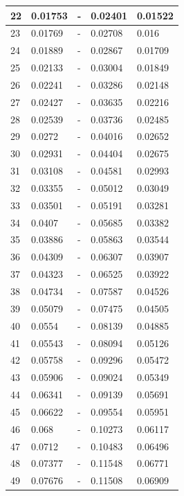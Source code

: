 \begin{table}[!ht]
\begin{tabular}{|l|l|l|l|l|}
        22 & 0.01753 & - & 0.02401 & 0.01522 \\ \hline
        23 & 0.01769 & - & 0.02708 & 0.016 \\ \hline
        24 & 0.01889 & - & 0.02867 & 0.01709 \\ \hline
        25 & 0.02133 & - & 0.03004 & 0.01849 \\ \hline
        26 & 0.02241 & - & 0.03286 & 0.02148 \\ \hline
        27 & 0.02427 & - & 0.03635 & 0.02216 \\ \hline
        28 & 0.02539 & - & 0.03736 & 0.02485 \\ \hline
        29 & 0.0272 & - & 0.04016 & 0.02652 \\ \hline
        30 & 0.02931 & - & 0.04404 & 0.02675 \\ \hline
        31 & 0.03108 & - & 0.04581 & 0.02993 \\ \hline
        32 & 0.03355 & - & 0.05012 & 0.03049 \\ \hline
        33 & 0.03501 & - & 0.05191 & 0.03281 \\ \hline
        34 & 0.0407 & - & 0.05685 & 0.03382 \\ \hline
        35 & 0.03886 & - & 0.05863 & 0.03544 \\ \hline
        36 & 0.04309 & - & 0.06307 & 0.03907 \\ \hline
        37 & 0.04323 & - & 0.06525 & 0.03922 \\ \hline
        38 & 0.04734 & - & 0.07587 & 0.04526 \\ \hline
        39 & 0.05079 & - & 0.07475 & 0.04505 \\ \hline
        40 & 0.0554 & - & 0.08139 & 0.04885 \\ \hline
        41 & 0.05543 & - & 0.08094 & 0.05126 \\ \hline
        42 & 0.05758 & - & 0.09296 & 0.05472 \\ \hline
        43 & 0.05906 & - & 0.09024 & 0.05349 \\ \hline
        44 & 0.06341 & - & 0.09139 & 0.05691 \\ \hline
        45 & 0.06622 & - & 0.09554 & 0.05951 \\ \hline
        46 & 0.068 & - & 0.10273 & 0.06117 \\ \hline
        47 & 0.0712 & - & 0.10483 & 0.06496 \\ \hline
        48 & 0.07377 & - & 0.11548 & 0.06771 \\ \hline
        49 & 0.07676 & - & 0.11508 & 0.06909 \\ \hline

\end{tabular}
\end{table}
